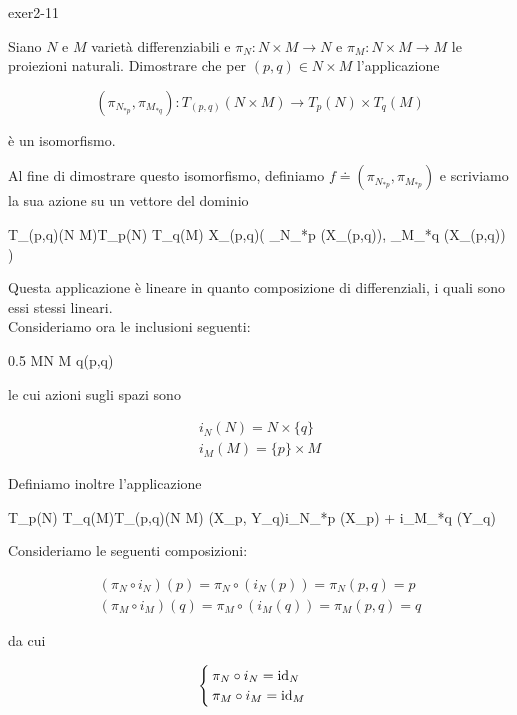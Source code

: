 {exer2-11}
{
Siano $ N $ e $ M $ varietà differenziabili e $ \pi_{N} : N \times M \to N $ e $ \pi_{M} : N \times M \to M $ le proiezioni naturali. Dimostrare che per $ (p,q) \in N \times M $ l'applicazione

\begin{equation}
	(\pi_{N_{*p}},\pi_{M_{*q}}) : T_{(p,q)}(N \times M) \to T_{p}(N) \times T_{q}(M)
\end{equation}

è un isomorfismo.
}
{

Al fine di dimostrare questo isomorfismo, definiamo $ f \doteq (\pi_{N_{*p}},\pi_{M_{*p}}) $ e scriviamo la sua azione su un vettore del dominio

	{T_{(p,q)}(N \times M)}{T_{p}(N) \times T_{q}(M)}
	{X_{(p,q)}}{\left( \pi_{N_{*p}} (X_{(p,q)}), \pi_{M_{*q}} (X_{(p,q)}) \right)}

Questa applicazione è lineare in quanto composizione di differenziali, i quali sono essi stessi lineari. \\
Consideriamo ora le inclusioni seguenti:

	{0.5}{%
				{M}{N \times M}
				{q}{(p,q)}
			}

le cui azioni sugli spazi sono

\begin{gather}
	i_{N}(N) = N \times \{q\} \\
	i_{M}(M) = \{p\} \times M
\end{gather}

Definiamo inoltre l'applicazione

	{T_{p}(N) \times T_{q}(M)}{T_{(p,q)}(N \times M)}
	{(X_{p}, Y_{q})}{i_{N_{*p}} (X_{p}) + i_{M_{*q}} (Y_{q})}

Consideriamo le seguenti composizioni:

\begin{gather}
	(\pi_{N} \circ i_{N}) (p) = \pi_{N} \circ (i_{N} (p)) = \pi_{N} (p,q) = p \\
	(\pi_{M} \circ i_{M}) (q) = \pi_{M} \circ (i_{M} (q)) = \pi_{M} (p,q) = q
\end{gather}

da cui

\begin{equation}
	\begin{cases}
		\pi_{N} \circ i_{N} = \operatorname{id}_{N} \\
		\pi_{M} \circ i_{M} = \operatorname{id}_{M}
	\end{cases}
\end{equation}

}
